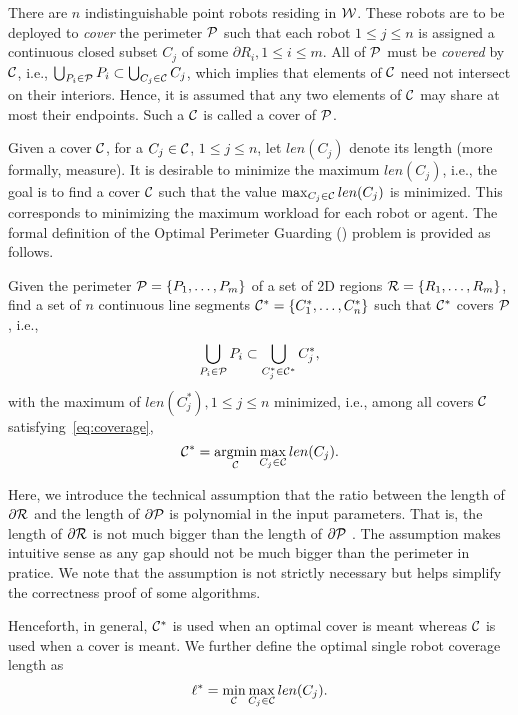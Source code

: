 There are $n$ indistinguishable point robots residing in $\W$.
These robots are to be deployed to {\em cover} the perimeter $\P$ such 
that each robot $1 \le j \le n$ is assigned a continuous closed subset 
$C_j$ of some $\partial R_i, 1 \le i \le m$. All of $\P$ must be 
{\em covered} by $\C$, i.e., 
%
$\bigcup_{P_i \in \P} P_i  \subset \bigcup_{C_j \in \C} C_j$,
%
which implies that elements of $\C$ need not intersect on their
interiors. Hence, it is assumed that any two elements of $\C$ may share 
at most their endpoints. Such a $\C$ is called a cover of $\P$. 

Given a cover $\C$, for a $C_j \in \C$, $1 \le j \le n$, let $len(C_j)$ 
denote its length (more formally, measure). It is desirable to minimize 
the maximum $len(C_j)$, i.e., the goal is to find a cover $\C$ such that 
the value 
%
$\max_{C_j \in \C} len(C_j)$
%
is minimized. This corresponds to minimizing the maximum workload for 
each robot or agent. The formal definition of the Optimal Perimeter 
Guarding (\opg) problem is provided as follows. 

\begin{problem} Given the perimeter 
$\P = \{P_1, \ldots, P_m\}$ of a set of 2D regions $\R =\{R_1, \ldots, 
R_m\}$, find a set of $n$ continuous line segments $\C^* = \{C_1^*, 
\ldots, C_n^*\}$ such that $\C^*$ covers $\P$, i.e., 
\begin{align}\label{eq:opg-coverage}
\bigcup_{P_i \in \P} P_i  \subset \bigcup_{C_j^* \in \C^*} C_j^*,
\end{align}
with the maximum of $len(C_j^*), 1 \le j \le n$ minimized, i.e., among all 
covers $\C$ satisfying~\eqref{eq:coverage}, 
\begin{align}\label{eq:opg-objective}
\C^* = \underset{\C}{\mathrm{argmin}} \max_{C_j \in \C} len(C_j).
\end{align}
\end{problem}

Here, we introduce the technical assumption that the ratio between 
the length of $\partial \R$ and the length of $\partial \P$ is polynomial
in the input parameters. That is, the length of $\partial \R$ is not much 
bigger than the length of $\partial \P$ . 
The assumption makes intuitive sense as any 
gap should not be much bigger than the perimeter in pratice. We note 
that the assumption is not strictly necessary but helps simplify the 
correctness proof of some algorithms. 

Henceforth, in general, $\C^*$ is used when an optimal cover is meant 
whereas $\C$ is used when a cover is meant. We further define the optimal 
single robot coverage length as 
\begin{align}\label{eq:opg-l-star}
\vspace*{-1mm}
\ell^* = \min_{\C} \max_{C_j \in \C} len(C_j).
\vspace*{-1mm}
\end{align}

